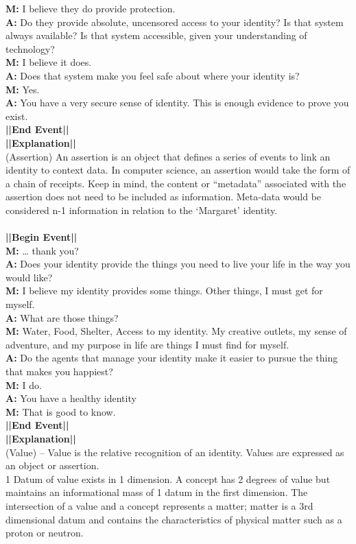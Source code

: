 \documentclass{article}
\begin{document}
\textbf{M:} I believe they do provide protection. \\
\textbf{A:} Do they provide absolute, uncensored access to your identity? Is that system always available? Is that system accessible, given your understanding of technology? \\
\textbf{M:} I believe it does. \\
\textbf{A:} Does that system make you feel safe about where your identity is? \\
\textbf{M:} Yes. \\
\textbf{A:} You have a very secure sense of identity.  This is enough evidence to prove you exist. \\
\textbf{||End Event||} \\
\textbf{||Explanation||} \\(Assertion) An assertion is an object that defines a series of events to link an identity to context data.  In computer science, an assertion would take the form of a chain of receipts.  Keep in mind, the content or “metadata” associated with the assertion does not need to be included as information.  Meta-data would be considered n-1 information in relation to the ‘Margaret’ identity.\\\\
\textbf{||Begin Event||} \\
\textbf{M:} … thank you? \\ 
\textbf{A:} Does your identity provide the things you need to live your life in the way you would like? \\
\textbf{M:} I believe my identity provides some things.  Other things, I must get for myself. \\
\textbf{A:} What are those things? \\
\textbf{M:} Water, Food, Shelter, Access to my identity.  My creative outlets, my sense of adventure, and my purpose in life are things I must find for myself. \\ 
\textbf{A:} Do the agents that manage your identity make it easier to pursue the thing that makes you happiest? \\
\textbf{M:} I do. \\
\textbf{A:} You have a healthy identity \\
\textbf{M:} That is good to know. \\
\textbf{||End Event||} \\
\textbf{||Explanation||} \\ (Value) – Value is the relative recognition of an identity.  Values are expressed as an object or assertion. \\
1 Datum of value exists in 1 dimension. A concept has 2 degrees of value but maintains an informational mass of 1 datum in the first dimension. The intersection of a value and a concept represents a matter; matter is a 3rd dimensional datum and contains the characteristics of physical matter such as a proton or neutron.
\end{document}
